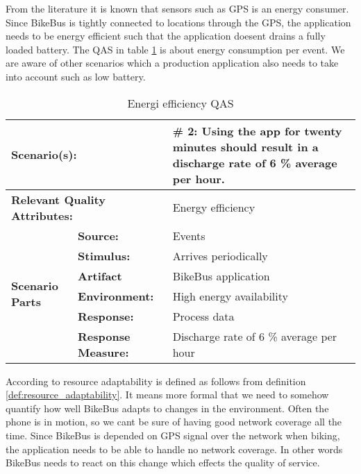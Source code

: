 From the literature \cite{Kjaergaard2010} it is known that sensors such as GPS is an energy consumer. Since BikeBus is tightly connected to locations through the GPS, the application needs to be energy efficient such that the application doesent drains a fully loaded battery. The QAS in table \ref{table:energi_efficiency_qas} is about energy consumption per event. We are aware of other scenarios which a production application also needs to take into account such as low battery.

\begin{table}[H]
\begin{center}
\begin{tabular}{|p{0.3cm}|p{2.5cm}|p{8cm}|}
  \hline
  \multicolumn{2}{|p{3cm}|}{\bfseries Scenario(s):} & \#  2: Using the app for twenty minutes should result in a discharge rate of 6 \% average per hour.  \\
  \hline
  \multicolumn{2}{|p{3cm}|}{\bfseries Relevant Quality Attributes:} & Energy efficiency\\
  \hline
  \multirow{6}{*}{\begin{sideways}{\bfseries Scenario Parts}\end{sideways}}
  & {\bfseries Source:} & Events \\
  \cline{2-3}
  & {\bfseries Stimulus:} & Arrives periodically \\
  \cline{2-3}
  & {\bfseries Artifact} &  BikeBus application \\
  \cline{2-3}
  & {\bfseries Environment:} &  High energy availability \\
  \cline{2-3}
  & {\bfseries Response:} &  Process data\\
  \cline{2-3}
  & {\bfseries Response Measure:} & Discharge rate of 6 \% average per hour \\
  \hline
\end{tabular}
\caption{Energi efficiency QAS}
\label{table:energi_efficiency_qas}
\end{center}
\end{table}

According to \cite{Kjaergaard:2015:AQT:2737182.2737196} resource adaptability is defined as follows from definition \ref{def:resource_adaptability}. It means more formal that we need to somehow quantify how well BikeBus adapts to changes in the environment. Often the phone is in motion, so we cant be sure of having good network coverage all the time. Since BikeBus is depended on GPS signal over the network when biking, the application needs to be able to handle no network coverage. In other words BikeBus needs to react on this change which effects the quality of service.    

